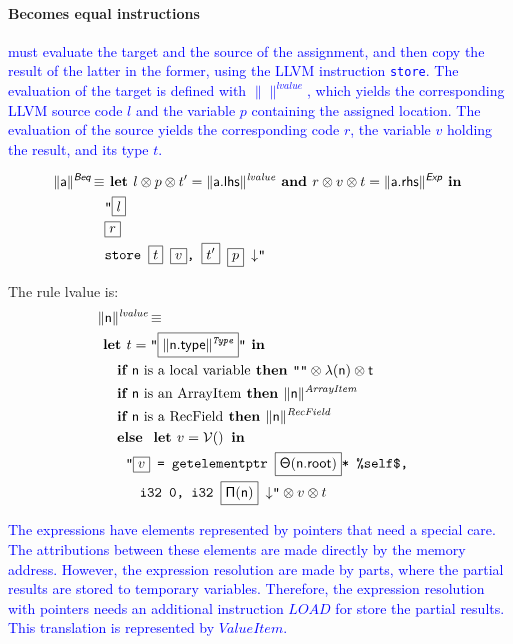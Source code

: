 \documentclass{llncs}
\newcommand{\trad}[2]{\ensuremath{\lVert \textsf{#1} \rVert^{\textit{#2}}}}
\newcommand{\nl}[0]{\ensuremath{\downarrow}}
\DeclareMathOperator{\isdef}{\equiv}
\DeclareMathOperator{\variable}{\mathcal{V}()}
\newcommand{\llvm}[1]{\texttt{#1}}
\newcommand{\B}[1]{\textsf{#1}}
\newcommand{\IF}[0]{\textbf{ if }}
\newcommand{\ELSE}[0]{\textbf{ else }}
\newcommand{\THEN}[0]{\textbf{ then }}
\newcommand{\LET}[0]{\textbf{ let }}
\newcommand{\IN}[0]{\textbf{ in }}
\newcommand{\AND}[0]{\textbf{ and }}
\newcommand{\PH}[1]{\framebox{$#1$}}
\newcommand{\sep}[0]{\otimes}
\newcommand{\local}[0]{\ensuremath{\sf\lambda}}
\newcommand{\idx}[0]{\ensuremath{\sf\Pi}}
\newcommand{\state}[0]{\ensuremath{\sf\Theta}}
\begin{document}
\paragraph{Becomes equal instructions} \textcolor{blue}{ must evaluate the
 target and the source of the assignment, and then copy the result of the 
latter in the former, using the LLVM instruction \llvm{store}. The evaluation 
of the target is defined with $\trad{}{lvalue}$, which yields the corresponding 
LLVM source code $l$ and the variable $p$ containing the assigned location. The 
evaluation of the source yields the corresponding code $r$, the variable $v$ 
holding the result, and its type $t$. }

\begin{align*}
\begin{split}
  \trad{a}{\B{Beq}} \isdef
  & \LET l \sep p \sep t'= \trad{a.lhs}{lvalue} \AND r \sep v \sep t = \trad{a.rhs}{\B{Exp}} \IN \\
  & \llvm{"\PH{l}} \\
  & \llvm{\PH{r}} \\
  & \llvm{store \PH{t} \PH{v}, \PH{t'} \PH{p} \nl"}
\end{split}
\end{align*}

The rule lvalue is:
\begin{align*}
\lefteqn{\trad{n}{lvalue} \isdef} \\
& \LET t = \llvm{"\PH{\trad{\B{n.type}}{Type}}"} \IN \\
& \quad \IF \mbox{\B{n} is a local variable} \THEN \llvm{""} \sep \local(\B{n}) \sep t \\
& \quad \IF \mbox{\B{n} is an ArrayItem} \THEN  \trad{n}{ArrayItem} \\
& \quad \IF \mbox{\B{n} is a RecField} \THEN  \trad{n}{RecField} \\
& \quad \ELSE \LET v = \variable \IN \\
& \quad \quad \llvm{"\PH{v} = getelementptr \PH{\state(\B{n.root})}* \%self\$,} \\
& \quad \quad \quad \llvm{i32 0, i32 \PH{\idx(\B{n})} \nl"} \sep v \sep t
\end{align*}

\textcolor{blue}{ The expressions have elements represented by pointers that need a special 
care. The attributions between these elements are made  directly by the memory 
address.  However, the expression resolution are made by parts, where the 
partial results are stored to temporary variables. Therefore, the expression 
resolution with pointers needs an additional instruction $LOAD$ for store the 
partial results. This translation is represented by $ValueItem$.} 
\end{document}
